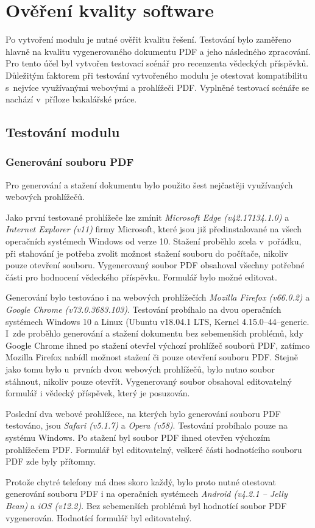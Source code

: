 \chapter{Ověření kvality software}
Po vytvoření modulu je nutné ověřit kvalitu řešení. Testování bylo zaměřeno hlavně na kvalitu vygenerovaného dokumentu PDF a jeho následného zpracování. Pro tento účel byl vytvořen testovací scénář pro recenzenta vědeckých příspěvků. Důležitým faktorem při testování vytvořeného modulu je otestovat kompatibilitu s~nejvíce využívanými webovými a prohlížeči PDF. Vyplněné testovací scénáře se nachází v~příloze bakalářské práce.

\section{Testování modulu}

\subsection{Generování souboru PDF}
Pro generování a stažení dokumentu bylo použito šest nejčastěji využívaných webových prohlížečů.
\par
Jako první testované prohlížeče lze zmínit \textit{Microsoft Edge (v42.17134.1.0)} a \textit{Internet Explorer (v11)} firmy Microsoft, které jsou již předinstalované na všech operačních systémech Windows od verze 10. Stažení proběhlo zcela v~pořádku, při stahování je potřeba zvolit možnost stažení souboru do počítače, nikoliv pouze otevření souboru. Vygenerovaný soubor PDF obsahoval všechny potřebné části pro hodnocení vědeckého příspěvku. Formulář bylo možné editovat.
\par
Generování bylo testováno i na webových prohlížečích \textit{Mozilla Firefox (v66.0.2)} a \textit{Google Chrome (v73.0.3683.103)}. Testování probíhalo na dvou operačních systémech Windows 10 a Linux (Ubuntu v18.04.1 LTS, Kernel 4.15.0--44--generic. I~zde proběhlo generování a stažení dokumentu bez sebemenších problémů, kdy Google Chrome ihned po stažení otevřel výchozí prohlížeč souborů PDF, zatímco Mozilla Firefox nabídl možnost stažení či pouze otevření souboru PDF. Stejně jako tomu bylo u~prvních dvou webových prohlížečů, bylo nutno soubor stáhnout, nikoliv pouze otevřít. Vygenerovaný soubor obsahoval editovatelný formulář i vědecký příspěvek, který je posuzován.
\par
Poslední dva webové prohlížece, na kterých bylo generování souboru PDF testováno, jsou \textit{Safari (v5.1.7)} a \textit{Opera (v58)}. Testování probíhalo pouze na systému Windows. Po stažení byl soubor PDF ihned otevřen výchozím prohlížečem PDF. Formulář byl editovatelný, veškeré části hodnotícího souboru PDF zde byly přítomny.
\par
Protože chytré telefony má dnes skoro každý, bylo proto nutné otestovat generování souboru PDF i na operačních systémech \textit{Android (v4.2.1 -- Jelly Bean)} a \textit{iOS (v12.2)}. Bez sebemenších problémů byl hodnotící soubor PDF vygenerován. Hodnotící formulář byl editovatelný.

